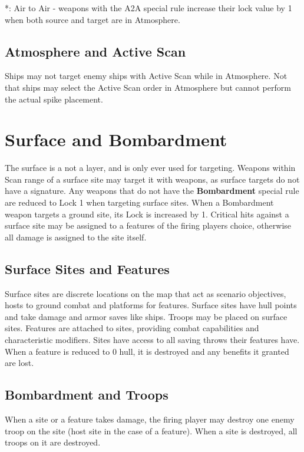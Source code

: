 *: Air to Air - weapons with the A2A special rule increase their lock value by 1 when both source and target are in Atmosphere.

\subsection{Atmosphere and Active Scan}
Ships may not target enemy ships with Active Scan while in Atmosphere. Not that ships may select the Active Scan order in Atmosphere but cannot perform the actual spike placement.

\section{Surface and Bombardment} \label{sec:SurfaceBombardment}
The surface is a not a layer, and is only ever used for targeting. Weapons within Scan range of a surface site may target it with weapons, as surface targets do not have a signature. Any weapons that do not have the \textbf{Bombardment} special rule are reduced to Lock 1 when targeting surface sites. When a Bombardment weapon targets a ground site, its Lock is increased by 1. Critical hits against a surface site may be assigned to a features of the firing players choice, otherwise all damage is assigned to the site itself.

\subsection{Surface Sites and Features}
Surface sites are discrete locations on the map that act as scenario objectives, hosts to ground combat and platforms for features. Surface sites have hull points and take damage and armor saves like ships. Troops may be placed on surface sites. Features are attached to sites, providing combat capabilities and characteristic modifiers. Sites have access to all saving throws their features have. When a feature is reduced to 0 hull, it is destroyed and any benefits it granted are lost.

\subsection{Bombardment and Troops}
When a site or a feature takes damage, the firing player may destroy one enemy troop on the site (host site in the case of a feature). When a site is destroyed, all troops on it are destroyed.